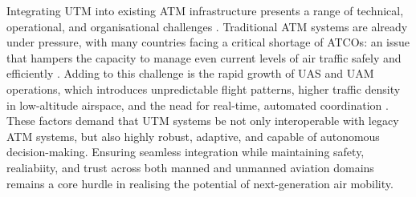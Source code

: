 Integrating \gls{UTM} into existing \gls{ATM} infrastructure presents a range of technical, operational, and organisational challenges \cite{Singh_2024}.
Traditional \gls{ATM} systems are already under pressure, with many countries facing a critical shortage of \glspl{ATCO}: an issue that hampers the capacity to manage even current levels of air traffic safely and efficiently \cite{eurocontrol2024digitalisation}.
Adding to this challenge is the rapid growth of \gls{UAS} and \gls{UAM} operations, which introduces unpredictable flight patterns, higher traffic density in low-altitude airspace, and the nead for real-time, automated coordination \cite{Ramachandran_2025}.
These factors demand that \gls{UTM} systems be not only interoperable with legacy \gls{ATM} systems, but also highly robust, adaptive, and capable of autonomous decision-making.
Ensuring seamless integration while maintaining safety, realiabiity, and trust across both manned and unmanned aviation domains remains a core hurdle in realising the potential of next-generation air mobility.



% 
% 
% 
% 
% 
% 
% 